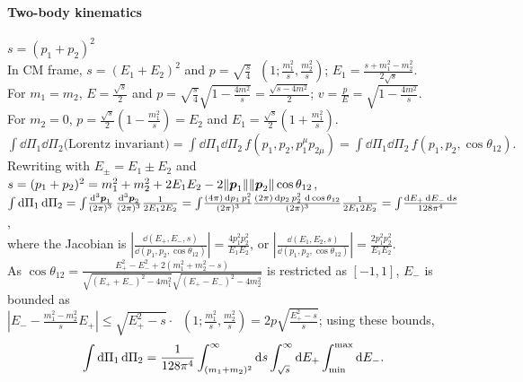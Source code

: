 \documentclass[new]{subfiles}
\begin{document}
\paragraph{Two-body kinematics}
$s=(p_1+p_2)^2$\\
In CM frame, $s=(E_1+E_2)^2$ and
$p= \sqrt{\frac{s}{4}}\mathop{\lambda^{1/2}}\left(1;\frac{m_1^2}{s},\frac{m_2^2}{s}\right)$;
\quad
$E_1 = \frac{s+m_1^2-m_2^2}{2\sqrt{s}}$.
\\
For $m_1=m_2$, $E=\frac{\sqrt{s}}{2}$ and $
p = \sqrt{\frac{s}{4}}\sqrt{1-\frac{4 m^2}{s}}
=\frac{\sqrt{s-4m^2}}{2}$; $v=\frac{p}{E}=\sqrt{1-\frac{4m^2}{s}}$.
\\
For $m_2=0$, $p=\frac{\sqrt{s}}{2}\left(1-\frac{m_1^2}{s}\right)=E_2$ and
$E_1=\frac{\sqrt{s}}{2}\left(1+\frac{m_1^2}{s}\right)$.
$
\int\!\dd\Pi_1\dd\Pi_2\text{(Lorentz invariant)}
= \int\!\dd\Pi_1\dd\Pi_2\,f(p_1, p_2, p_1^\mu p_{2\mu})
= \int\!\dd\Pi_1\dd\Pi_2\,f(p_1,p_2,\cos\theta_{12}).
$
\\
Rewriting with $E_\pm = E_1\pm E_2$ and $s=(p_1+p_2)^2=m_1^2 + m_2^2 + 2E_1E_2 - 2\|{\boldsymbol{p}}_1\|\|{\boldsymbol{p}}_2\|\cos\theta_{12}$,
\\
$
\int\dd\Pi_1\dd\Pi_2
=
\int\ddP{p_1}\,\,\ddP{p_2}\frac{1}{2E_12E_2}
=
\int\!\frac{(4\pi)\dd p_1\,p_1^2}{(2\pi)^3}
\frac{(2\pi)\dd p_2\,p_2^2\,\dd\cos\theta_{12}}{(2\pi)^3}\frac{1}{2E_12E_2}
=
\int\!\frac{\dd E_+\dd E_- \dd s}{128\pi^4}
$,
\\
where the Jacobian is $\left|\frac{\dd(E_+,E_-,s)}{\dd(p_1, p_2, \cos\theta_{12})}\right|=\frac{4p_1^2p_2^2}{E_1E_2}$, or $\left|\frac{\dd(E_1,E_2,s)}{\dd(p_1, p_2, \cos\theta_{12})}\right|=\frac{2p_1^2p_2^2}{E_1E_2}.$
\\
As $
\cos\theta_{12}=\frac{E_+^2-E_-^2+2 \left(m_1^2+m_2^2-s\right)}{\sqrt{(E_++E_-)^2-4 m_1^2}\sqrt{(E_+-E_-)^2-4 m_2^2}}
$ is restricted as $[-1,1]$, $E_-$ is bounded as
\\
$
\left|E_- - \frac{m_1^2-m_2^2}{s}E_+\right| 
\le
\sqrt{E_+^2-s}\cdot\mathop{\lambda^{1/2}}\left(1;\frac{m_1^2}{s},\frac{m_2^2}{s}\right)
=
2p\sqrt{\frac{E_+^2-s}{s}}
$; using these bounds,
\begin{equation}
 \int\mathop{}\!\mathrm{d}\Pi_1\mathop{}\!\mathrm{d}\Pi_2
=
\frac{1}{128\pi^4}
\int_{(m_1+m_2)^2}^\infty\mathop{}\!\mathrm{d} s
\int_{\sqrt{s}}^\infty\mathop{}\!\mathrm{d} E_+
\int_{\mathrm{min}}^{\mathrm{max}}\mathop{}\!\mathrm{d} E_-.
\end{equation}
\end{document}
